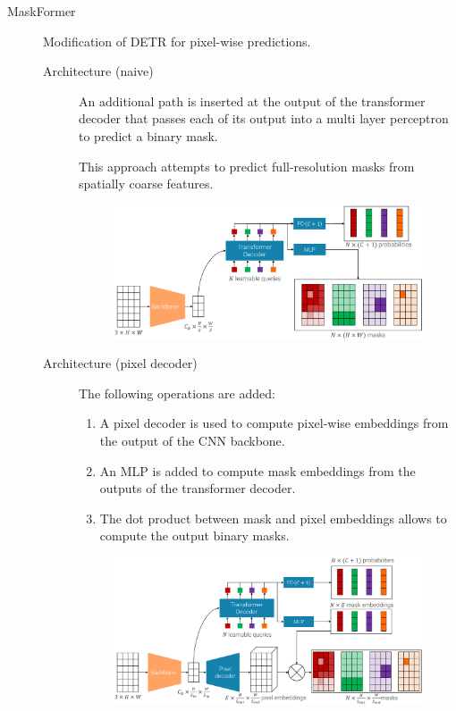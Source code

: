 \begin{description}
    \item[MaskFormer] 
        Modification of DETR for pixel-wise predictions.

        \begin{description}
            \item[Architecture (naive)] 
                An additional path is inserted at the output of the transformer decoder that passes each of its output into a multi layer perceptron to predict a binary mask.

                \begin{remark}
                    This approach attempts to predict full-resolution masks from spatially coarse features.
                \end{remark}

                \begin{figure}[H]
                    \centering
                    \includegraphics[width=0.75\linewidth]{./img/_maskformer_naive.pdf}
                \end{figure}

            \item[Architecture (pixel decoder)] 
                The following operations are added:
                \begin{enumerate}
                    \item A pixel decoder is used to compute pixel-wise embeddings from the output of the CNN backbone.
                    \item An MLP is added to compute mask embeddings from the outputs of the transformer decoder.
                    \item The dot product between mask and pixel embeddings allows to compute the output binary masks.
                \end{enumerate}

                \begin{figure}[H]
                    \centering
                    \includegraphics[width=0.75\linewidth]{./img/_maskformer_decoder.pdf}
                \end{figure}


\end{description}
\end{description}
